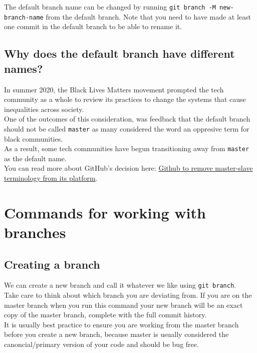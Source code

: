 The default branch name can be changed by running \texttt{git branch -M new-branch-name} from the default branch. Note that you need to have made at least one commit in the default branch to be able to rename it.
\\

\subsection{Why does the default branch have different names?}

In summer 2020, the Black Lives Matters movement prompted the tech community as a whole to review its practices to change the systems that cause inequalities across society.
\\

One of the outcomes of this consideration, was feedback that the default branch should not be called \texttt{master} as many considered the word an oppresive term for black communities.
\\

As a result, some tech communities have begun transitioning away from \texttt{master} as the default name.
\\

You can read more about GitHub's decision here: \href{https://www.vice.com/en/article/k7qbyv/github-to-remove-masterslave-terminology-from-its-platform}{Github to remove master-slave terminology from its platform}.

\section{Commands for working with branches}


\subsection{Creating a branch}

We can create a new branch and call it whatever we like using \texttt{git branch}.
\\

Take care to think about which branch you are deviating from. If you are on the master branch when you run this command your new branch will be an exact copy of the master branch, complete with the full commit history.
\\

It is usually best practice to ensure you are working from the master branch before you create a new branch, because master is usually considered the canoncial/primary version of your code and should be bug free.

